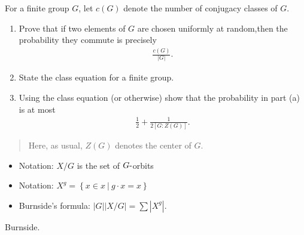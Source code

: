 For a finite group \(G\), let \(c(G)\) denote the number of conjugacy
classes of \(G\).

\begin{enumerate}
\def\labelenumi{\alph{enumi}.}
\item
  Prove that if two elements of \(G\) are chosen uniformly at
  random,then the probability they commute is precisely
  \begin{align*}
  \frac{c(G)}{{\left\lvert {G} \right\rvert}}
  .\end{align*}
\item
  State the class equation for a finite group.
\item
  Using the class equation (or otherwise) show that the probability in
  part (a) is at most
  \begin{align*}
  \frac 1 2 + \frac 1 {2[G : Z(G)]}
  .\end{align*}
\end{enumerate}

\begin{quote}
Here, as usual, \(Z(G)\) denotes the center of \(G\).
\end{quote}

\begin{concept}

\envlist

\begin{itemize}
\tightlist
\item
  Notation: \(X/G\) is the set of \(G{\hbox{-}}\)orbits
\item
  Notation:
  \(X^g = \left\{{x\in x{~\mathrel{\Big|}~}g\cdot x = x}\right\}\)
\item
  Burnside's formula:
  \({\left\lvert {G} \right\rvert} {\left\lvert {X/G} \right\rvert} = \sum {\left\lvert {X^g} \right\rvert}\).
\end{itemize}

\end{concept}

\begin{strategy}

Burnside.

\end{strategy}

